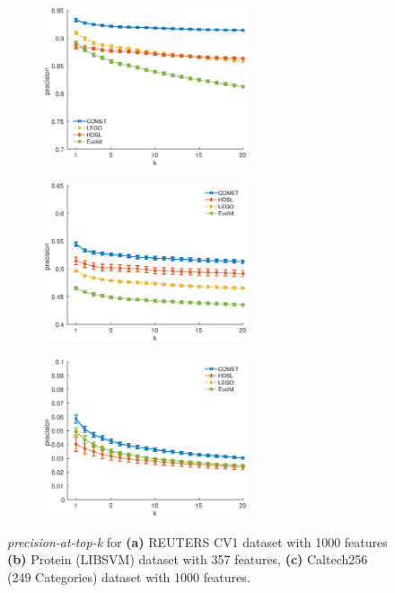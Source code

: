 \documentclass[twoside,11pt]{article}
\begin{document}
\begin{figure}[ht]

{
\begin{subfigure}[]
  \centering
  \includegraphics[width=6cm]{precision@k_rcv1_4_ig1000}
\end{subfigure}%
\begin{subfigure}[]
  \centering
  \includegraphics[width=6cm]{precision@k_protein}
\end{subfigure}%
\begin{subfigure}[]
  \centering
  \includegraphics[width=6cm]{precision@k_Caltech256_with_249Categories}
\end{subfigure}
\setcounter{subfigure}{0} %
\captionsetup{font=small}

{\caption{\textit{precision-at-top-k} for  {\bf (a)} REUTERS CV1 dataset with 1000 features {\bf (b)} Protein (LIBSVM) dataset with 357 features, {\bf (c)} Caltech256 (249 Categories) dataset with 1000 features.}}
}
\end{figure}%


\vskip 0.2in
\clearpage 

\end{document}
